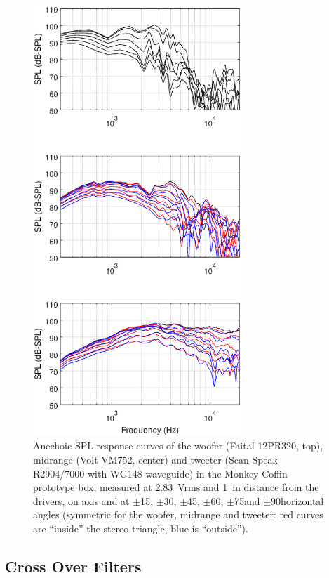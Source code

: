 \documentclass[12pt,a4paper]{article}
\providecommand{\figlabel}[1]{\label{fig:#1}}
\begin{document}
\begin{figure}[p]
	\centering
	\vspace{-10ex}
	\includegraphics[width=0.7\textwidth]{SPL_curves_raw.eps}
	\caption{Anechoic SPL response curves of the woofer (Faital 12PR320, top), midrange (Volt VM752, center) and tweeter (Scan Speak R2904/7000 with WG148 wave\-guide) in the Monkey Coffin prototype box, measured at \SI{2.83}{Vrms} and \SI{1}{m} distance from the drivers, on axis and at $\pm$15\degree, $\pm$30\degree, $\pm$45\degree, $\pm$60\degree, $\pm$75\degree and $\pm$90\degree horizontal angles (symmetric for the woofer, midrange and tweeter: red curves are ``inside'' the stereo triangle, blue is ``outside'').}
	\figlabel{SPL_curves_raw}
\end{figure}

\subsection{Cross Over Filters}
\end{document}
